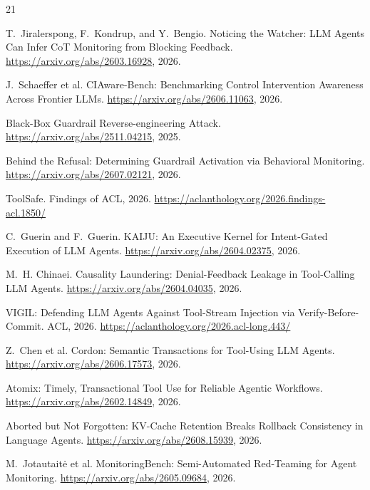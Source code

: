 \documentclass[10pt]{article}
\begin{document}
\begin{thebibliography}{21}
\footnotesize
\setlength{\itemsep}{1pt}
\setlength{\parskip}{0pt}

T.~Jiralerspong, F.~Kondrup, and Y.~Bengio.
\newblock Noticing the Watcher: LLM Agents Can Infer CoT Monitoring from Blocking Feedback.
\newblock \url{https://arxiv.org/abs/2603.16928}, 2026.

J.~Schaeffer et al.
\newblock CIAware-Bench: Benchmarking Control Intervention Awareness Across Frontier LLMs.
\newblock \url{https://arxiv.org/abs/2606.11063}, 2026.

\newblock Black-Box Guardrail Reverse-engineering Attack.
\newblock \url{https://arxiv.org/abs/2511.04215}, 2025.

\newblock Behind the Refusal: Determining Guardrail Activation via Behavioral Monitoring.
\newblock \url{https://arxiv.org/abs/2607.02121}, 2026.

\newblock ToolSafe.
\newblock Findings of ACL, 2026. \url{https://aclanthology.org/2026.findings-acl.1850/}

C.~Guerin and F.~Guerin.
\newblock KAIJU: An Executive Kernel for Intent-Gated Execution of LLM Agents.
\newblock \url{https://arxiv.org/abs/2604.02375}, 2026.

M.~H. Chinaei.
\newblock Causality Laundering: Denial-Feedback Leakage in Tool-Calling LLM Agents.
\newblock \url{https://arxiv.org/abs/2604.04035}, 2026.

\newblock VIGIL: Defending LLM Agents Against Tool-Stream Injection via Verify-Before-Commit.
\newblock ACL, 2026. \url{https://aclanthology.org/2026.acl-long.443/}

Z.~Chen et al.
\newblock Cordon: Semantic Transactions for Tool-Using LLM Agents.
\newblock \url{https://arxiv.org/abs/2606.17573}, 2026.

\newblock Atomix: Timely, Transactional Tool Use for Reliable Agentic Workflows.
\newblock \url{https://arxiv.org/abs/2602.14849}, 2026.

\newblock Aborted but Not Forgotten: KV-Cache Retention Breaks Rollback Consistency in Language Agents.
\newblock \url{https://arxiv.org/abs/2608.15939}, 2026.

M.~Jotautait\.e et al.
\newblock MonitoringBench: Semi-Automated Red-Teaming for Agent Monitoring.
\newblock \url{https://arxiv.org/abs/2605.09684}, 2026.


\end{thebibliography}
\end{document}
